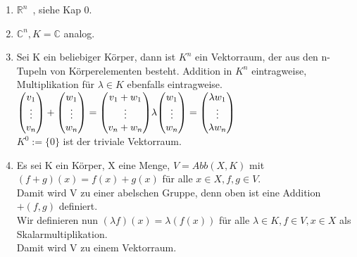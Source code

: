 \documentclass{report}
\newcommand{\lb}{\lambda}
\newcommand{\C}{\mathbb{C}}
\newcommand{\mRn}{$\mathbb{R}^n$\ }
\newcommand{\ve}[1]{{\begin{pmatrix}#1 \end{pmatrix}}}
\renewcommand{\v}{\ve}
\theoremstyle{customrem}
\theoremstyle{customdef}
\begin{document}
\begin{enumerate}
\item{\mRn, siehe Kap 0.}
\item{$\C^n, K = \C$ analog.}
\item{Sei K ein beliebiger Körper, dann ist $K^n$ ein Vektorraum, der aus den n-Tupeln von Körperelementen besteht. Addition in $K^n$ eintragweise, Multiplikation für $\lb \in K$ ebenfalls eintragweise.\\
$
\v{v_1\\ \vdots\\ v_n} + \v{w_1\\ \vdots\\ w_n} = \v{v_1 + w_1\\ \vdots \\ v_n + w_n}\\
\lb \v{w_1\\ \vdots\\ w_n} = \v{\lb w_1\\ \vdots \\ \lb w_n}
$\\
$K^0 := \{0\}$ ist der triviale Vektorraum.}
\item{Es sei K ein Körper, X eine Menge, $V = Abb(X, K)$ mit\\
$(f + g)(x) = f(x) + g(x)$ für alle $x \in X, f, g \in V$.\\
Damit wird V zu einer abelschen Gruppe, denn oben ist eine Addition $+(f, g)$ definiert.\\
Wir definieren nun $(\lb f)(x) = \lb (f(x))$ für alle $\lb \in K, f \in V, x \in X$ als Skalarmultiplikation.\\
Damit wird V zu einem Vektorraum.
}
\end{enumerate}
\end{document}

